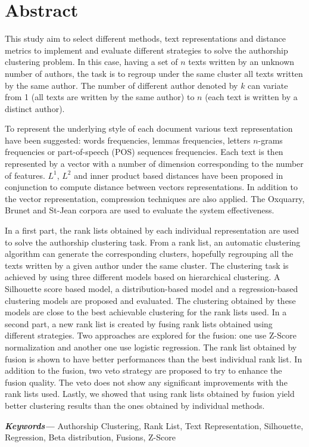 \chapter*{Abstract}
This study aim to select different methods, text representations and distance metrics to implement and evaluate different strategies to solve the authorship clustering problem.
In this case, having a set of $n$ texts written by an unknown number of authors, the task is to regroup under the same cluster all texts written by the same author.
The number of different author denoted by $k$ can variate from 1 (all texts are written by the same author) to $n$ (each text is written by a distinct author).

To represent the underlying style of each document various text representation have been suggested: words frequencies, lemmas frequencies, letters $n$-grams frequencies or part-of-speech (POS) sequences frequencies.
Each text is then represented by a vector with a number of dimension corresponding to the number of features.
$L^1$, $L^2$ and inner product based distances have been proposed in conjunction to compute distance between vectors representations.
In addition to the vector representation, compression techniques are also applied.
The Oxquarry, Brunet and St-Jean corpora are used to evaluate the system effectiveness.

In a first part, the rank lists obtained by each individual representation are used to solve the authorship clustering task.
From a rank list, an automatic clustering algorithm can generate the corresponding clusters, hopefully regrouping all the texts written by a given author under the same cluster.
The clustering task is achieved by using three different models based on hierarchical clustering.
A Silhouette score based model, a distribution-based model and a regression-based clustering models are proposed and evaluated.
The clustering obtained by these models are close to the best achievable clustering for the rank lists used.
In a second part, a new rank list is created by fusing rank lists obtained using different strategies.
Two approaches are explored for the fusion: one use Z-Score normalization and another one use logistic regression.
The rank list obtained by fusion is shown to have better performances than the best individual rank list.
In addition to the fusion, two veto strategy are proposed to try to enhance the fusion quality.
The veto does not show any significant improvements with the rank lists used.
Lastly, we showed that using rank lists obtained by fusion yield better clustering results than the ones obtained by individual methods.


{\small \textbf{\textit{Keywords---}} Authorship Clustering, Rank List, Text Representation, Silhouette, Regression, Beta distribution, Fusions, Z-Score}
